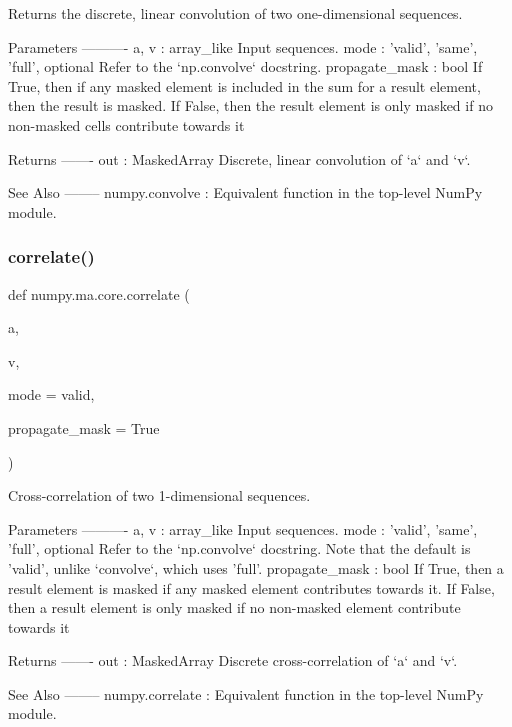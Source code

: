 \begin{DoxyVerb}Returns the discrete, linear convolution of two one-dimensional sequences.

Parameters
----------
a, v : array_like
    Input sequences.
mode : {'valid', 'same', 'full'}, optional
    Refer to the `np.convolve` docstring.
propagate_mask : bool
    If True, then if any masked element is included in the sum for a result
    element, then the result is masked.
    If False, then the result element is only masked if no non-masked cells
    contribute towards it

Returns
-------
out : MaskedArray
    Discrete, linear convolution of `a` and `v`.

See Also
--------
numpy.convolve : Equivalent function in the top-level NumPy module.
\end{DoxyVerb}
 \mbox{\label{namespacenumpy_1_1ma_1_1core_af7f36bda79d44815ecf097941ee48285}} 
\subsubsection{\texorpdfstring{correlate()}{correlate()}}
{\footnotesize\ttfamily def numpy.\+ma.\+core.\+correlate (\begin{DoxyParamCaption}\item[{}]{a,  }\item[{}]{v,  }\item[{}]{mode = {\ttfamily \textquotesingle{}valid\textquotesingle{}},  }\item[{}]{propagate\+\_\+mask = {\ttfamily True} }\end{DoxyParamCaption})}

\begin{DoxyVerb}Cross-correlation of two 1-dimensional sequences.

Parameters
----------
a, v : array_like
    Input sequences.
mode : {'valid', 'same', 'full'}, optional
    Refer to the `np.convolve` docstring.  Note that the default
    is 'valid', unlike `convolve`, which uses 'full'.
propagate_mask : bool
    If True, then a result element is masked if any masked element contributes towards it.
    If False, then a result element is only masked if no non-masked element
    contribute towards it

Returns
-------
out : MaskedArray
    Discrete cross-correlation of `a` and `v`.

See Also
--------
numpy.correlate : Equivalent function in the top-level NumPy module.
\end{DoxyVerb}
 \mbox{\label{namespacenumpy_1_1ma_1_1core_a3cef629d89518ed23337efe857681a5d}} 
